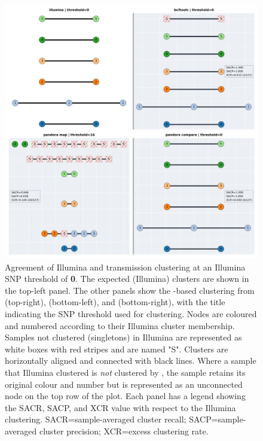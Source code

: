 \begin{figure}
\begin{center}
\includegraphics[width=0.90\columnwidth]{Chapter2/Figs/clustering-t0.png}
\caption{{Agreement of Illumina and \ont{} transmission clustering at an Illumina SNP threshold of \textbf{0}. The expected (Illumina) clusters are shown in the top-left panel. The other panels show the \ont{}-based clustering from \bcftools{} (top-right), \map{} (bottom-left), and \compare{} (bottom-right), with the title indicating the SNP threshold used for clustering. Nodes are coloured and numbered according to their Illumina cluster membership. Samples not clustered (singletons) in Illumina are represented as white boxes with red stripes and are named "S". Clusters are horizontally aligned and connected with black lines. Where a sample that Illumina clustered is \emph{not} clustered by \ont{}, the sample retains its original colour and number but is represented as an unconnected node on the top row of the plot. Each \ont{} panel has a legend showing the SACR, SACP, and XCR value with respect to the Illumina clustering. SACR=sample-averaged cluster recall; SACP=sample-averaged cluster precision; XCR=excess clustering rate.
{\label{fig:clustering-t0}}
}}
\end{center}
\end{figure}

